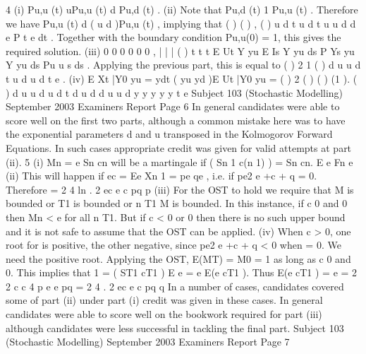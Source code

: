 4 (i) Pu,u (t) uPu,u (t) d Pu,d (t) .
(ii) Note that Pu,d (t) 1 Pu,u (t) . Therefore we have
Pu,u (t) d ( u d )Pu,u (t) ,
implying that
( ) ( )
, ( ) u d t u d t
u u d
d
e P t e
dt
.
Together with the boundary condition Pu,u(0) = 1, this gives the required
solution.
(iii)
0 0 0 0 0 0 ,
| | | ( )
t t t
E Ut Y yu E Is Y yu ds P Ys yu Y yu ds Pu u s ds .
Applying the previous part, this is equal to
( )
2 1
( )
d u u d t
u d u d
t e .
(iv) E Xt |Y0 yu = ydt ( yu yd )E Ut |Y0 yu
= ( )
2
( )
( ) (1 ).
( )
d u u d u d t
d u d
d u u d
y y
y y y t e
Subject 103 (Stochastic Modelling) September 2003 Examiners Report
Page 6
In general candidates were able to score well on the first two parts, although a common mistake here
was to have the exponential parameters d and u transposed in the Kolmogorov Forward Equations.
In such cases appropriate credit was given for valid attempts at part (ii).
5 (i) Mn = e Sn cn will be a martingale if ( Sn 1 c(n 1) ) = Sn cn.
E e Fn e
(ii) This will happen if ec = Ee Xn 1 = pe qe , i.e. if pe2 e +c + q = 0.
Therefore
=
2 4
ln .
2
ec e c pq
p
(iii) For the OST to hold we require that M is bounded or T1 is bounded or
n T1 M
is bounded.
In this instance, if c 0 and 0 then Mn < e for all n T1. But if c < 0 or
0 then there is no such upper bound and it is not safe to assume that the
OST can be applied.
(iv) When c > 0, one root for is positive, the other negative, since
pe2 e +c + q < 0 when = 0. We need the positive root.
Applying the OST, E(MT) = M0 = 1 as long as c 0 and 0. This implies
that
1 = ( ST1 cT1 ) E e = e E(e cT1 ).
Thus
E(e cT1 ) = e =
2
2
c c 4
p
e e pq
=
2 4
.
2
ec e c pq
q
In a number of cases, candidates covered some of part (ii) under part (i) credit was given in these
cases. In general candidates were able to score well on the bookwork required for part (iii) although
candidates were less successful in tackling the final part.
Subject 103 (Stochastic Modelling) September 2003 Examiners Report
Page 7
